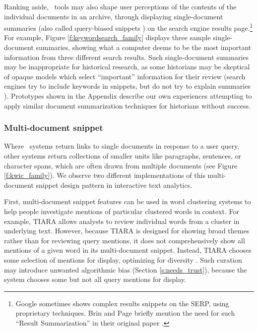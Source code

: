 

Ranking aside, \Baselongname~tools may also shape user perceptions of the contents of the individual documents in an archive, through displaying single-document summaries (also called query-biased snippets \cite{querybiased}) on the search engine results page.\footnote{
Google sometimes shows complex results snippets on the SERP, using proprietary techniques. 
Brin and Page briefly mention the need for such ``Result Summarization'' in their original paper \cite[Section 6.1]{pagerank}.
} 
For example, Figure \ref{f:keywordsearch_family} displays three sample single-document summaries, showing what a computer deems to be the most important information from three different search results.
Such single-document summaries may be inappropriate for historical research, as some historians may be skeptical of opaque models which select ``important'' information for their review (search engines try to include keywords in snippets, but do not try to explain summaries \cite[Section 6.3.1]{croft2010search}).
Prototypes shown in the Appendix describe our own experiences attempting to apply similar document summarization techniques for historians without success.

\subsubsection{Multi-document snippet}\label{s:snippets_family}

Where \Baselongname~systems return links to single documents in response to a user query,
other systems return collections of smaller units like paragraphs, sentences, or character spans, which are often drawn from multiple documents (see Figure \ref{f:kwic_family}).
We observe two different implementations of this multi-document snippet design pattern in interactive text analytics.

First, multi-document snippet features can be used in word clustering systems to help people investigate mentions of particular clustered words in context.
For example, TIARA \cite{tiara} allows analysts to review individual words from a cluster in underlying text.
However, because TIARA is designed for showing broad themes rather than for reviewing query mentions, 
it does not comprehensively show all mentions of a given word in its multi-document snippet.
Instead, TIARA chooses some selection of mentions for display, optimizing for diversity \cite[Section 6]{tiara}.
Such curation may introduce unwanted algorithmic bias (Section \ref{s:needs_trust}), because the system chooses some but not all query mentions for display.

